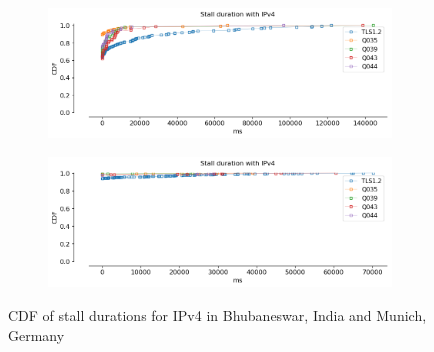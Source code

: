 \begin{frame}
\begin{figure}[!htb]
    
    \begin{subfigure}{0.5\textwidth}
        \includegraphics[width=\linewidth]{./plots/youtube/india/graph_stall_durations.png}
    \end{subfigure}
    \begin{subfigure}{0.5\textwidth}
        \includegraphics[width=\linewidth]{./plots/youtube/munich/graph_stall_durations.png}
    \end{subfigure}    
    \caption{CDF of stall durations for IPv4 in Bhubaneswar, India and Munich, Germany}\label{fig:cdf-of-stall}
\end{figure}
\end{frame}
\clearpage


